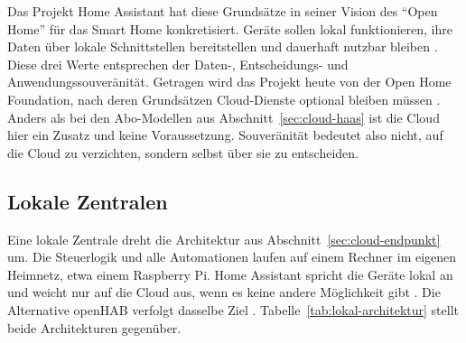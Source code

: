 Das Projekt Home Assistant hat diese Grundsätze in seiner Vision des
\enquote{Open Home} für das Smart Home konkretisiert. Geräte sollen lokal
funktionieren, ihre Daten über lokale Schnittstellen bereitstellen und
dauerhaft nutzbar bleiben
\cite[Abschn.~\enquote{Privacy}, \enquote{Choice}, \enquote{Sustainability}]{homeassistant:2021}.
Diese drei Werte entsprechen der Daten-, Entscheidungs- und
Anwendungssouveränität. Getragen wird das Projekt heute von der Open Home
Foundation, nach deren Grundsätzen Cloud-Dienste optional bleiben müssen
\cite[Abschn.~\enquote{Privacy}]{ohf:oj}. Anders als bei den Abo-Modellen aus
Abschnitt~\ref{sec:cloud-haas} ist die Cloud hier ein Zusatz und keine
Voraussetzung. Souveränität bedeutet also nicht, auf die Cloud zu verzichten,
sondern selbst über sie zu entscheiden.

\subsection{Lokale Zentralen}\label{sec:lokal-zentralen}

Eine lokale Zentrale dreht die Architektur aus
Abschnitt~\ref{sec:cloud-endpunkt} um. Die Steuerlogik und alle Automationen
laufen auf einem Rechner im eigenen Heimnetz, etwa einem Raspberry Pi. Home
Assistant spricht die Geräte lokal an und weicht nur auf die Cloud aus, wenn
es keine andere Möglichkeit gibt
\cite[Abschn.~\enquote{All your smart home data stays local}]{homeassistant:oj}.
Die Alternative openHAB verfolgt dasselbe Ziel
\cite[Abschn.~\enquote{No Cloud Required\dots}]{openhab:oj}.
Tabelle~\ref{tab:lokal-architektur} stellt beide Architekturen gegenüber.

